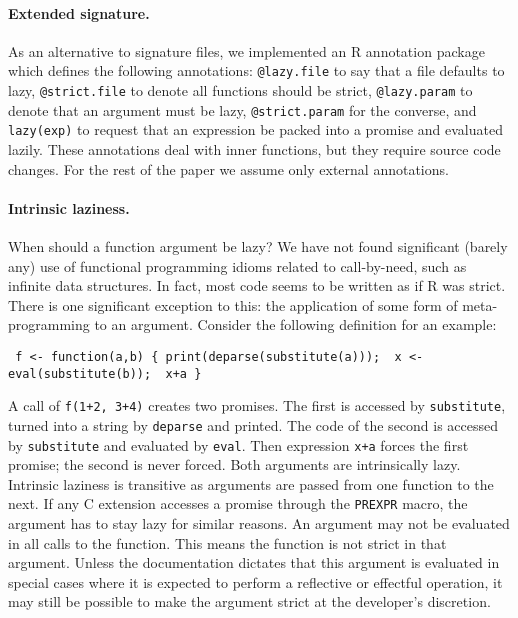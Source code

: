 \documentclass[review,nonacm,screen,acmsmall,anonymous=true]{acmart}
\newcommand{\code}[1]{\lstinline |#1|\xspace}
\renewcommand{\c}[1]{\lstinline |#1|\xspace}
\begin{document}
\paragraph{Extended signature.}
As an alternative to signature files, we implemented an R annotation package
which defines the following annotations: \c{@lazy.file} to say that a
file defaults to lazy, \c{@strict.file} to denote all functions should be
strict, \c{@lazy.param} to denote that an argument must be lazy,
\c{@strict.param} for the converse, and \c{lazy(exp)} to request that an
expression be packed into a promise and evaluated lazily. These annotations deal
with inner functions, but they require source code changes. For the rest of the
paper we assume only external annotations.

\paragraph{Intrinsic laziness.} When should a function argument be lazy?
We have not found significant (barely any) use of functional programming idioms
related to call-by-need, such as infinite data structures. In fact, most code
seems to be written as if R was strict. There is one significant exception to
this: the application of some form of meta-programming to an argument.
Consider the following definition for an example:
\begin{lstlisting}
 f <- function(a,b) { print(deparse(substitute(a)));  x <- eval(substitute(b));  x+a }
\end{lstlisting}

\medskip
\noindent
A call of \c{f(1+2, 3+4)} creates two promises. The first is accessed by
\c{substitute}, turned into a string by \c{deparse} and printed. The code of the
second is accessed by \c{substitute} and evaluated by \c{eval}. Then expression
\c{x+a} forces the first promise; the second is never forced. Both arguments are
intrinsically lazy. Intrinsic laziness is transitive as arguments are passed
from one function to the next. If any C extension accesses a promise through the
\code{PREXPR} macro, the argument has to stay lazy for similar reasons. An
argument may not be evaluated in all calls to the function. This means the
function is not strict in that argument. Unless the documentation dictates that
this argument is evaluated in special cases where it is expected to perform a
reflective or effectful operation, it may still be possible to make the argument
strict at the developer's discretion.
\end{document}
